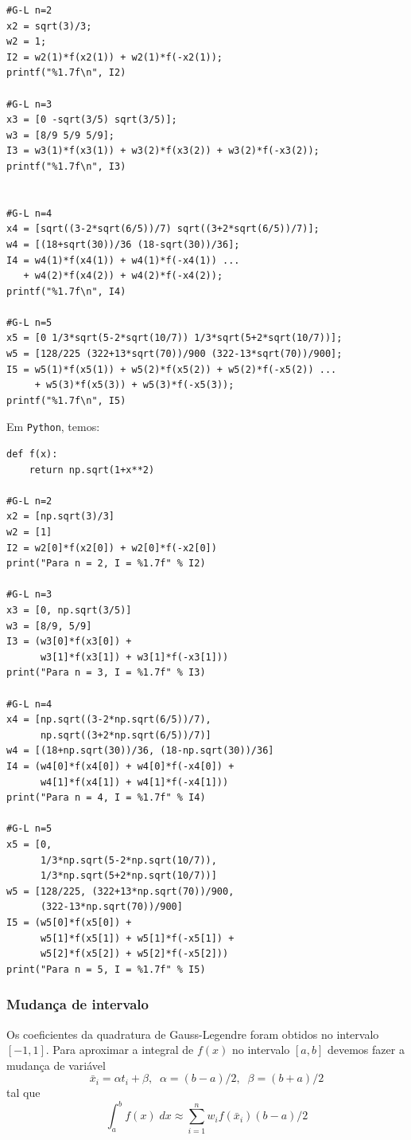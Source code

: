 \begin{sol}
\begin{verbatim}
#G-L n=2
x2 = sqrt(3)/3;
w2 = 1;
I2 = w2(1)*f(x2(1)) + w2(1)*f(-x2(1));
printf("%1.7f\n", I2)

#G-L n=3
x3 = [0 -sqrt(3/5) sqrt(3/5)];
w3 = [8/9 5/9 5/9];
I3 = w3(1)*f(x3(1)) + w3(2)*f(x3(2)) + w3(2)*f(-x3(2));
printf("%1.7f\n", I3)


#G-L n=4
x4 = [sqrt((3-2*sqrt(6/5))/7) sqrt((3+2*sqrt(6/5))/7)];
w4 = [(18+sqrt(30))/36 (18-sqrt(30))/36];
I4 = w4(1)*f(x4(1)) + w4(1)*f(-x4(1)) ...
   + w4(2)*f(x4(2)) + w4(2)*f(-x4(2));
printf("%1.7f\n", I4)

#G-L n=5
x5 = [0 1/3*sqrt(5-2*sqrt(10/7)) 1/3*sqrt(5+2*sqrt(10/7))];
w5 = [128/225 (322+13*sqrt(70))/900 (322-13*sqrt(70))/900];
I5 = w5(1)*f(x5(1)) + w5(2)*f(x5(2)) + w5(2)*f(-x5(2)) ...
     + w5(3)*f(x5(3)) + w5(3)*f(-x5(3));
printf("%1.7f\n", I5)
\end{verbatim}
\fi
\ifispython
Em \verb+Python+, temos:
\begin{verbatim}
def f(x):
    return np.sqrt(1+x**2)

#G-L n=2
x2 = [np.sqrt(3)/3]
w2 = [1]
I2 = w2[0]*f(x2[0]) + w2[0]*f(-x2[0])
print("Para n = 2, I = %1.7f" % I2)

#G-L n=3
x3 = [0, np.sqrt(3/5)]
w3 = [8/9, 5/9]
I3 = (w3[0]*f(x3[0]) +
      w3[1]*f(x3[1]) + w3[1]*f(-x3[1]))
print("Para n = 3, I = %1.7f" % I3)

#G-L n=4
x4 = [np.sqrt((3-2*np.sqrt(6/5))/7),
      np.sqrt((3+2*np.sqrt(6/5))/7)]
w4 = [(18+np.sqrt(30))/36, (18-np.sqrt(30))/36]
I4 = (w4[0]*f(x4[0]) + w4[0]*f(-x4[0]) +
      w4[1]*f(x4[1]) + w4[1]*f(-x4[1]))
print("Para n = 4, I = %1.7f" % I4)

#G-L n=5
x5 = [0,
      1/3*np.sqrt(5-2*np.sqrt(10/7)),
      1/3*np.sqrt(5+2*np.sqrt(10/7))]
w5 = [128/225, (322+13*np.sqrt(70))/900,
      (322-13*np.sqrt(70))/900]
I5 = (w5[0]*f(x5[0]) +
      w5[1]*f(x5[1]) + w5[1]*f(-x5[1]) +
      w5[2]*f(x5[2]) + w5[2]*f(-x5[2]))
print("Para n = 5, I = %1.7f" % I5)
\end{verbatim}
\fi
\end{sol}

\subsubsection{Mudança de intervalo}
Os coeficientes da quadratura de Gauss-Legendre foram obtidos no intervalo $[-1,1]$. Para aproximar a integral de $f(x)$ no intervalo $[a,b]$ devemos fazer a mudança de variável
\begin{equation}  \bar{x}_i=\alpha t_i+ \beta , \;\; \alpha =(b-a)/2, \;\; \beta = (b+a)/2  \end{equation}
tal que
\begin{equation}
 \int_{a}^{b} f(x) \; dx \approx \sum_{i=1}^n w_i f( \bar{x}_i ) (b-a)/2
\end{equation}


